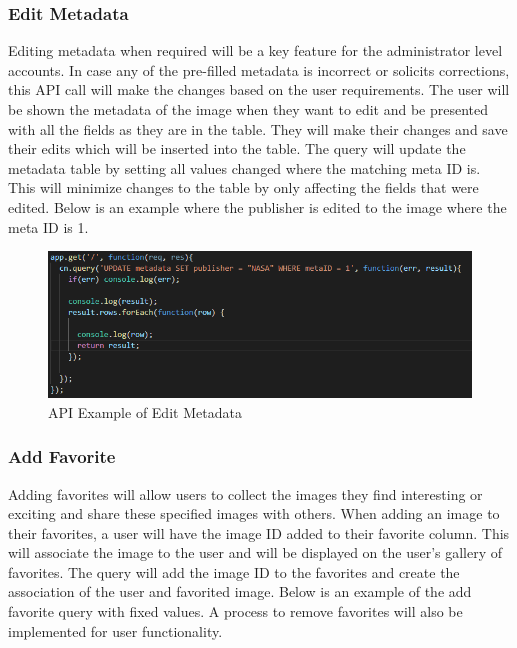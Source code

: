 \documentclass[12pt]{report}
\begin{document}
\subsubsection*{Edit Metadata}

Editing metadata when required will be a key feature for the administrator level accounts.  In case any of the pre-filled metadata is incorrect or solicits corrections, this API call will make the changes based on the user requirements.  The user will be shown the metadata of the image when they want to edit and be presented with all the fields as they are in the table.  They will make their changes and save their edits which will be inserted into the table.  The query will update the metadata table by setting all values changed where the matching meta ID is.  This will minimize changes to the table by only affecting the fields that were edited.  Below is an example where the publisher is edited to the image where the meta ID is 1.

\begin{figure}[h]
	\centering
	\includegraphics[scale=0.5]{api_edit_metadata}
	\caption{API Example of Edit Metadata}
	\label{fig:API Edit Metadata}
\end{figure}

\subsubsection*{Add Favorite}

Adding favorites will allow users to collect the images they find interesting or exciting and share these specified images with others.  When adding an image to their favorites, a user will have the image ID added to their favorite column.  This will associate the image to the user and will be displayed on the user’s gallery of favorites.  The query will add the image ID to the favorites and create the association of the user and favorited image.  Below is an example of the add favorite query with fixed values.  A process to remove favorites will also be implemented for user functionality.
\end{document}
